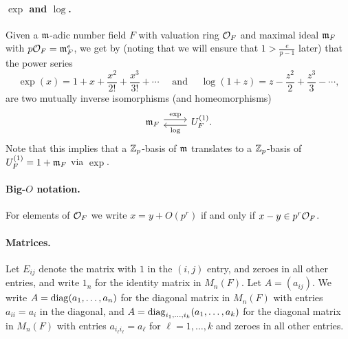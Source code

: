 \paragraph{$\exp$ and $\log$.} Given a $\mathfrak{m}$-adic number field $F$ with valuation ring $\mathcal{O}_{F}$ and maximal ideal $\mathfrak{m}_{F}$ with $p\mathcal{O}_{F} = \mathfrak{m}_{F}^{e}$, we get by \cite[Prop.~(5.5)]{Neukirch} (noting that we will ensure that $1 > \frac{e}{p-1}$ later) that the power series
\begin{equation*}
  \exp(x) = 1 + x + \frac{x^{2}}{2!} + \frac{x^{3}}{3!} + \dotsb \quad \text{ and } \quad \log(1+z) = z - \frac{z^{2}}{2} + \frac{z^{3}}{3} - \dotsb,
\end{equation*}
are two mutually inverse isomorphisms (and homeomorphisms)
\[
  \begin{tikzcd}
    \idm_{F} \ar[r, yshift=0.7ex, "\exp"] & U_{F}^{(1)}. \ar[l, yshift=-0.7ex, "\log"]
  \end{tikzcd}
\]
Note that this implies that a $\mathbb{Z}_{p}$-basis of $\mathfrak{m}$ translates to a $\mathbb{Z}_{p}$-basis of $U_{F}^{(1)} = 1+\mathfrak{m}_{F}$ via $\exp$.

\paragraph{Big-$O$ notation.} For elements of $\mathcal{O}_{F}$ we write $x = y + O(p^{r})$ if and only if $x-y \in p^{r}\mathcal{O}_{F}$.

\paragraph{Matrices.} Let $E_{ij}$ denote the matrix with $1$ in the $(i,j)$ entry, and zeroes in all other entries, and write $1_{n}$ for the identity matrix in $M_{n}(F)$. Let $A = (a_{ij})$. We write $A = \operatorname{diag}(a_{1},\dotsc,a_{n})$ for the diagonal matrix in $M_{n}(F)$ with entries $a_{ii}=a_{i}$ in the diagonal, and $A = \operatorname{diag}_{i_{1},\dotsc,i_{k}}(a_{1},\dotsc,a_{k})$ for the diagonal matrix in $M_{n}(F)$ with entries $a_{i_{\ell}i_{\ell}} = a_{\ell}$ for $\ell = 1,\dotsc,k$ and zeroes in all other entries.

